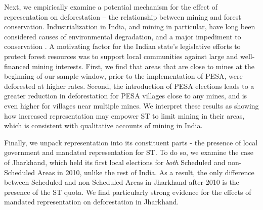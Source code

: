 \documentclass[12pt,reqno]{article}
\begin{document}
Next, we empirically examine a potential mechanism for the effect of representation on deforestation -- the relationship between mining and forest conservation. Industrialization in India, and mining in particular, have long been considered causes of environmental degradation, and a major impediment to conservation \parencite{roy2011walking, saha2011under, areendran2013land, downing2002avoiding}. A motivating factor for the Indian state's legislative efforts to protect forest resources was to support local communities against large and well-financed mining interests. First, we find that areas that are close to mines at the beginning of our sample window, prior to the implementation of PESA, were deforested at higher rates. Second, the introduction of PESA elections leads to a greater reduction in deforestation for PESA villages close to any mines, and is even higher for villages near multiple mines. We interpret these results as showing how increased representation may empower ST to limit mining in their areas, which is consistent with qualitative accounts of mining in India.

Finally, we unpack representation into its constituent parts - the presence of local government and mandated representation for ST. To do so, we examine the case of Jharkhand, which held its first local elections for \emph{both} Scheduled and non-Scheduled Areas in 2010, unlike the rest of India. As a result, the only difference between Scheduled and non-Scheduled Areas in Jharkhand after 2010 is the presence of the ST quota. We find particularly strong evidence for the effects of mandated representation on deforestation in Jharkhand.



\end{document}
